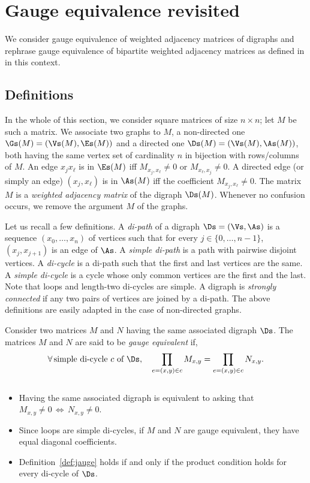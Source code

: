 \documentclass[a4paper,twoside,11pt]{article}
\begin{document}
\appendix


\section{Gauge equivalence revisited}\label{app:gauge}

We consider gauge equivalence of weighted adjacency matrices of digraphs and rephrase gauge equivalence of bipartite 
weighted adjacency matrices as defined in \cite{Kuperberg,KOS} in this context. 

\subsection{Definitions}\label{sec:app_gauge_1}

In the whole of this section, we consider square matrices of size $n\times n$;
let $M$ be such a matrix. We associate two graphs to $M$, a non-directed one $\Gs(M)=(\Vs(M),\Es(M))$
and a directed one $\Ds(M)=(\Vs(M),\As(M))$, both having the same vertex set of cardinality $n$ in bijection 
with rows/columns of $M$. 
An edge
$x_j x_\ell$ is in $\Es(M)$ iff $M_{x_j,x_\ell}\neq 0$ or $M_{x_\ell,x_j}\neq 0$. A directed edge (or simply an edge) $(x_j,x_\ell)$ is in
$\As(M)$ iff the coefficient $M_{x_j,x_\ell}\neq 0$. The matrix $M$ is a \emph{weighted adjacency matrix} of the digraph $\Ds(M)$.
Whenever no confusion occurs, we remove the argument $M$ of the graphs. 

Let us recall a few definitions.  A \emph{di-path} of a digraph
$\Ds=(\Vs,\As)$ is a sequence $(x_0,\dots,x_n)$ of vertices such that for every $j\in\{0,\dots,n-1\}$,
$(x_j,x_{j+1})$ is an edge of $\As$. A \emph{simple di-path} is a path with pairwise disjoint vertices.
A \emph{di-cycle} is a di-path such that the first and last vertices are the same. A \emph{simple di-cycle}
is a cycle whose only common vertices are the first and the last. Note that loops and length-two di-cycles are simple.
A digraph is \emph{strongly connected} if any two pairs of vertices are joined by a di-path.
The above definitions are easily adapted in the case of non-directed graphs.

\begin{defi}\label{def:jauge}
Consider two matrices $M$ and $N$ having the same associated digraph $\Ds$.
The matrices $M$ and $N$ are said to be \emph{gauge equivalent} if,
\[\forall\,
\text{simple di-cycle $c$ of $\Ds$},\quad
\prod_{e=(x,y)\in c} M_{x,y}=\prod_{e=(x,y)\in c} N_{x,y}.
\]
\end{defi}
\begin{rem}\label{rem:gauge1}$\,$
\begin{itemize}
\item  Having the same associated digraph is equivalent to asking that $M_{x,y}\neq 0\,\Leftrightarrow\,N_{x,y}\neq 0$.
\item Since loops are simple di-cycles, if $M$ and $N$ are gauge equivalent, they have equal diagonal coefficients.
\item Definition~\ref{def:jauge} holds if and only if the product condition holds for every di-cycle of $\Ds$. 
\end{itemize}
\end{rem}
\end{document}
